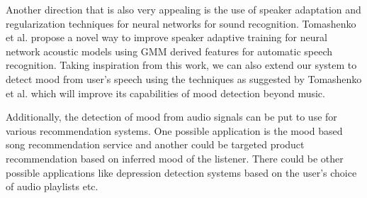 \documentclass{article}
\begin{document}
Another direction that is also very appealing is the use of speaker adaptation and regularization techniques for neural networks for sound recognition. Tomashenko et al. \cite{tomashenko} propose a novel way to improve speaker adaptive training for neural network acoustic models using GMM derived features for automatic speech recognition. Taking inspiration from this work, we can also extend our system to detect mood from user’s speech using the techniques as suggested by Tomashenko et al. which will improve its capabilities of mood detection beyond music. 

Additionally, the detection of mood from audio signals can be put to use for various recommendation systems. One possible application is the mood based song recommendation service and another could be targeted product recommendation based on inferred mood of the listener. There could be other possible applications like depression detection systems based on the user’s choice of audio playlists etc.  
  
 

\end{document}
